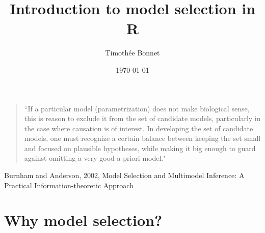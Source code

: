 \documentclass[10pt]{beamer}\usepackage[]{graphicx}\usepackage[]{color}
\title{Introduction to model selection in R}
\author{Timoth\'ee Bonnet}
\institute{BDSI / RSB}
\date{\today}
\begin{document}
\begin{frame}
  \begin{quote}
  ``If a particular model (parametrization) does not make biological sense,
this is reason to exclude it from the set of candidate models, particularly
in the case where causation is of interest. In developing the set of candidate
models, one must recognize a certain balance between keeping the set small
and focused on plausible hypotheses, while making it big enough to guard
against omitting a very good a priori model."
  \end{quote}

Burnham and Anderson, 2002, Model Selection and Multimodel Inference: A Practical Information-theoretic Approach

\end{frame}

\begin{frame}
\maketitle
\end{frame}





\section{Why model selection?}

\begin{frame}{}




\end{frame}
\end{document}
